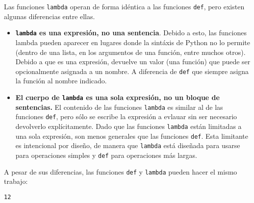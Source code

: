 \begin{Shaded}
\begin{Highlighting}[]
\end{Highlighting}
\end{Shaded}

Las funciones \texttt{lambda} operan de forma idéntica a las funciones
\texttt{def}, pero existen algunas diferencias entre ellas.

\begin{itemize}
\item
  \textbf{\texttt{lambda} es una expresión, no una sentencia}. Debido a
  esto, las funciones lambda pueden aparecer en lugares donde la
  sintáxis de Python no lo permite (dentro de una lista, en los
  argumentos de una función, entre muchos otros). Debido a que es una
  expresión, devuelve un valor (una función) que puede ser opcionalmente
  asignada a un nombre. A diferencia de \texttt{def} que siempre asigna
  la función al nombre indicado.
\item
  \textbf{El cuerpo de \texttt{lambda} es una sola expresión, no un
  bloque de sentencias.} El contenido de las funciones \texttt{lambda}
  es similar al de las funciones \texttt{def}, pero sólo se escribe la
  expresión a evlauar sin ser necesario devolverlo explícitamente. Dado
  que las funciones \texttt{lambda} están limitadas a una sola
  expresión, son menos generales que las funciones \texttt{def}. Esta
  limitante es intencional por diseño, de manera que \texttt{lambda}
  está diseñada para usarse para operaciones simples y \texttt{def} para
  operaciones más largas.
\end{itemize}

A pesar de sus diferencias, las funciones \texttt{def} y \texttt{lambda}
pueden hacer el mismo trabajo:

\begin{Shaded}
\begin{Highlighting}[]
    \OperatorTok{+}\OperatorTok{+}
\NormalTok{,}\NormalTok{,}\NormalTok{)}
\end{Highlighting}
\end{Shaded}

\begin{verbatim}
12
\end{verbatim}

